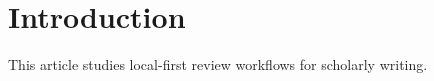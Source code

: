 \documentclass{article}
\begin{document}
\section{Introduction}
This article studies local-first review workflows for scholarly writing.
\end{document}
